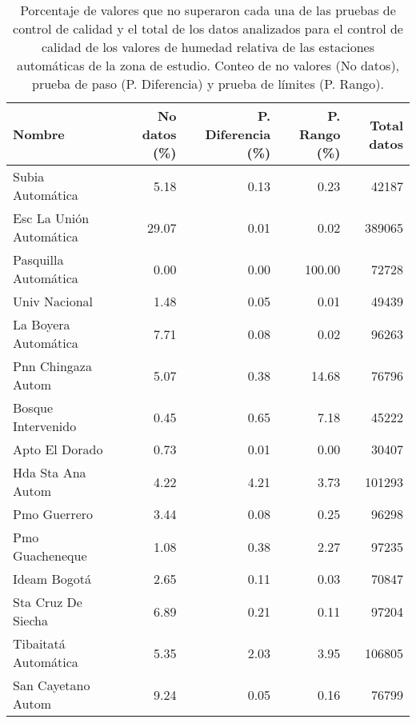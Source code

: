 \begin{table}[H]
\begin{center}

\caption{Porcentaje de valores que no superaron cada una de las pruebas de control de calidad y el total de los datos analizados para el control de calidad de los valores de humedad relativa de las estaciones automáticas de la zona de estudio. Conteo de no valores (No datos), prueba de paso (P. Diferencia) y prueba de límites (P. Rango).}
\label{tabla:val_humedad}

\begin{tabular}{p{5cm}rrrr}
\toprule
      Nombre &  No datos (\%) &  P. Diferencia (\%) &  P. Rango (\%) & Total datos \\
\midrule
         Subia Automática &      5.18 &           0.13 &      0.23 &         42187 \\
 Esc La Unión Automática &     29.07 &           0.01 &      0.02 &        389065 \\
    Pasquilla Automática &      0.00 &           0.00 &    100.00 &         72728 \\
           Univ Nacional &      1.48 &           0.05 &      0.01 &         49439 \\
    La Boyera Automática &      7.71 &           0.08 &      0.02 &         96263 \\
      Pnn Chingaza Autom &      5.07 &           0.38 &     14.68 &         76796 \\
      Bosque Intervenido &      0.45 &           0.65 &      7.18 &         45222 \\
          Apto El Dorado &      0.73 &           0.01 &      0.00 &         30407 \\
       Hda Sta Ana Autom &      4.22 &           4.21 &      3.73 &        101293 \\
            Pmo Guerrero &      3.44 &           0.08 &      0.25 &         96298 \\
         Pmo Guacheneque &      1.08 &           0.38 &      2.27 &         97235 \\
            Ideam Bogotá &      2.65 &           0.11 &      0.03 &         70847 \\
      Sta Cruz De Siecha &      6.89 &           0.21 &      0.11 &         97204 \\
    Tibaitatá Automática &      5.35 &           2.03 &      3.95 &        106805 \\
      San Cayetano Autom &      9.24 &           0.05 &      0.16 &         76799 \\

\end{tabular}
\end{center}
\end{table}
